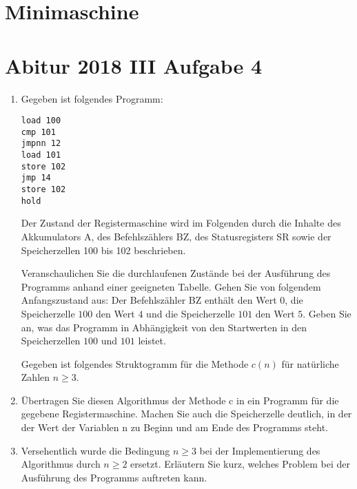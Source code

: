 \documentclass{lehramt-informatik-aufgabe}
\begin{document}
\section{Minimaschine}


\section{Abitur 2018 III Aufgabe 4}

\begin{enumerate}

%

\item Gegeben ist folgendes Programm:

\begin{verbatim}
load 100
cmp 101
jmpnn 12
load 101
store 102
jmp 14
store 102
hold
\end{verbatim}

Der Zustand der Registermaschine wird im Folgenden durch die Inhalte des
Akkumulators A, des Befehlszählers BZ, des Statusregisters SR sowie der
Speicherzellen 100 bis 102 beschrieben.

Veranschaulichen Sie die durchlaufenen Zustände bei der Ausführung des
Programms anhand einer geeigneten Tabelle. Gehen Sie von folgendem
Anfangszustand aus: Der Befehlszähler BZ enthält den Wert $0$, die
Speicherzelle $100$ den Wert $4$ und die Speicherzelle $101$ den Wert $5$. Geben
Sie an, was das Programm in Abhängigkeit von den Startwerten in den
Speicherzellen $100$ und $101$ leistet.

Gegeben ist folgendes Struktogramm für die Methode $c(n)$ für natürliche
Zahlen $n \geq 3$.

\item Übertragen Sie diesen Algorithmus der Methode c in ein Programm
für die gegebene Registermaschine. Machen Sie auch die Speicherzelle
deutlich, in der der Wert der Variablen n zu Beginn und am Ende des
Programms steht.

\begin{multicols}{2}


\liSpaltenUmbruch
{}

\end{multicols}

\item Versehentlich wurde die Bedingung $n \geq 3$ bei der
Implementierung des Algorithmus durch $n \geq 2$ ersetzt. Erläutern Sie
kurz, welches Problem bei der Ausführung des Programms auftreten kann.
\end{enumerate}
\end{document}
